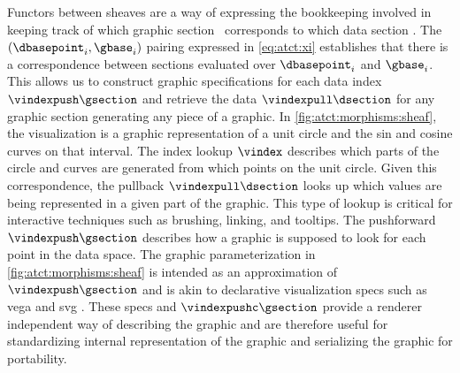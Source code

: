 \documentclass[journal]{IEEEtran}
\theoremstyle{definition}
\theoremstyle{remark}
\begin{document}
Functors between sheaves are a way of expressing the bookkeeping involved in keeping track of which graphic section \gsection\ corresponds to which data section \dsection. The $(\dbasepoint_i, \gbase_i)$ pairing expressed in \autoref{eq:atct:xi} establishes that there is a correspondence between sections evaluated over $\dbasepoint_i$ and $\gbase_i$. This allows us to construct graphic specifications for each data index $\vindexpush\gsection$ and retrieve the data $\vindexpull\dsection$ for any graphic section generating any piece of a graphic. In \autoref{fig:atct:morphisms:sheaf}, the visualization is a graphic representation of a unit circle and the sin and cosine curves on that interval. The index lookup $\vindex$ describes which parts of the circle and curves are generated from which points on the unit circle. Given this correspondence, the pullback $\vindexpull\dsection$ looks up which values are being represented in a given part of the graphic. This type of lookup is critical for interactive techniques such as brushing, linking, and tooltips\cite{beckerBrushingScatterplots1987}. The pushforward $\vindexpush\gsection$ describes how a graphic is supposed to look for each point in the data space. The graphic parameterization in \autoref{fig:atct:morphisms:sheaf} is intended as an approximation of $\vindexpush\gsection$ and is akin to declarative visualization specs such as vega \cite{satyanarayanDeclarativeInteractionDesign2014} and svg \cite{quintScalable2003}. These specs and $\vindexpushc\gsection$ provide a renderer independent way of describing the graphic and are therefore useful for standardizing internal representation of the graphic and serializing the graphic for portability.  
\end{document}
